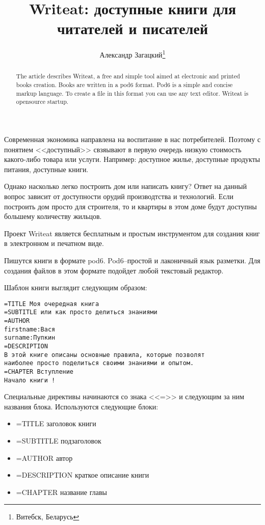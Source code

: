 \documentclass[10pt, a5paper]{article}
\begin{document}
\title{Writeat: доступные книги для читателей и писателей}%

\author{Александр Загацкий\footnote{Витебск, Беларусь}}
\maketitle

\begin{abstract}
The article describes Writeat, a free and simple tool aimed at electronic and printed books creation. Books are written in a pod6 format. Pod6 is a simple and concise markup language. To create a file in this format you can use any text editor. Writeat is opensource startup.
\end{abstract}


Современная экономика направлена на воспитание в нас потребителей. Поэтому с 
понятием <<доступный>>  свзяывают в первую очередь низкую стоимость какого-либо 
товара или услуги. Например: доступное жилье, доступные продукты питания, 
доступные книги.

Однако насколько легко построить дом или написать книгу? Ответ на данный вопрос
зависит от доступности орудий производтства и технологий. Если построить дом просто для строителя, то и квартиры в этом доме будут доступны большему количеству жильцов.

Проект Writeat \cite{zag1} является бесплатным и простым инструментом для создания книг в 
электронном и печатном виде.

Пишутся книги в формате pod6. Pod6--простой и лаконичный язык разметки.
Для создания файлов в этом формате подойдет любой текстовый редактор.

Шаблон книги выглядит следующим образом:

\begin{verbatim}
=TITLE Моя очередная книга
=SUBTITLE или как просто делиться знаниями
=AUTHOR
firstname:Вася
surname:Пупкин
=DESCRIPTION
В этой книге описаны основные правила, которые позволят 
наиболее просто поделиться своими знаниями и опытом.
=CHAPTER Вступление
Начало книги !
\end{verbatim}

Специальные директивы начинаются со знака <<=>> и следующим за ним названия блока.
Используются следующие блоки:

\begin{itemize}
  \item[~] =TITLE   заголовок книги
  \item[~] =SUBTITLE подзаголовок
  \item[~] =AUTHOR автор
  \item[~] =DESCRIPTION краткое описание книги
  \item[~] =CHAPTER название главы
\end{itemize}
\end{document}
